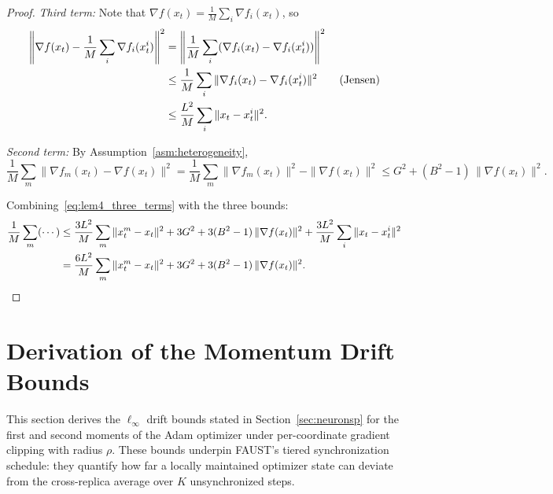 \documentclass{article}
\begin{document}
\begin{proof}
\noindent\emph{Third term:} Note that
$\nabla f(x_t) = \frac{1}{M}\sum_i\nabla f_i(x_t)$, so
\begin{align}
\left\|\nabla f(x_t) - \frac{1}{M}\sum_i\nabla f_i(x_t^i)\right\|^2
&= \left\|\frac{1}{M}\sum_i(\nabla f_i(x_t) - \nabla f_i(x_t^i))\right\|^2
\notag \\
&\leq \frac{1}{M}\sum_i\|\nabla f_i(x_t) - \nabla f_i(x_t^i)\|^2
\qquad\text{(Jensen)} \notag \\
&\leq \frac{L^2}{M}\sum_i\|x_t - x_t^i\|^2.
\label{eq:lem4_third}
\end{align}

\noindent\emph{Second term:} By Assumption~\ref{asm:heterogeneity},
\begin{equation}
\frac{1}{M}\sum_m\|\nabla f_m(x_t) - \nabla f(x_t)\|^2
= \frac{1}{M}\sum_m\|\nabla f_m(x_t)\|^2 - \|\nabla f(x_t)\|^2
\leq G^2 + (B^2 - 1)\,\|\nabla f(x_t)\|^2.
\label{eq:lem4_second}
\end{equation}

Combining~\eqref{eq:lem4_three_terms} with the three bounds:
\begin{align}
\frac{1}{M}\sum_m(\cdots)
&\leq \frac{3L^2}{M}\sum_m\|x_t^m - x_t\|^2
+ 3G^2 + 3(B^2-1)\,\|\nabla f(x_t)\|^2
+ \frac{3L^2}{M}\sum_i\|x_t - x_t^i\|^2 \notag \\
&= \frac{6L^2}{M}\sum_m\|x_t^m - x_t\|^2
+ 3G^2 + 3(B^2-1)\,\|\nabla f(x_t)\|^2.
\label{eq:lem4_final}
\end{align}
\end{proof}






\section{Derivation of the Momentum Drift Bounds}
\label{sec:drift_derivation}

This section derives the $\ell_\infty$ drift bounds stated in
Section~\ref{sec:neuronsp} for the first and second moments of the Adam
optimizer under per-coordinate gradient clipping with radius $\rho$.
These bounds underpin FAUST's tiered synchronization schedule: they
quantify how far a locally maintained optimizer state can deviate from
the cross-replica average over $K$ unsynchronized steps.
\end{document}
